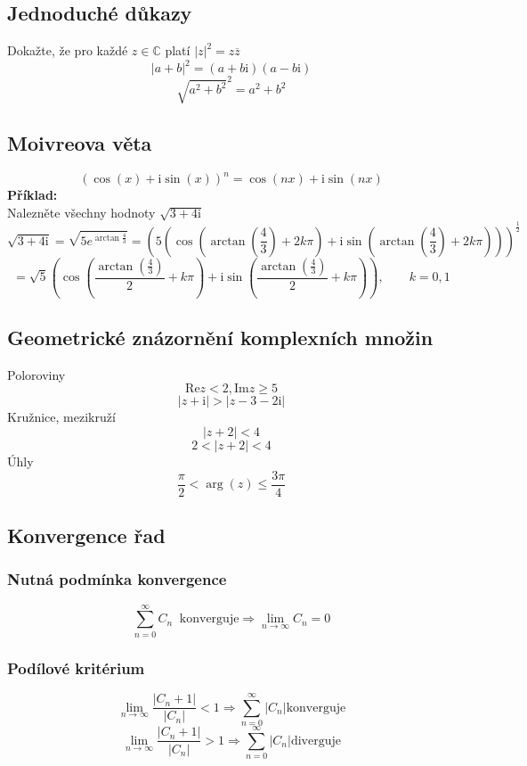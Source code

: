 \documentclass{article}
\newcommand{\mi}{\mathrm{i}}
\newcommand{\re}{\mathrm{Re}}
\newcommand{\im}{\mathrm{Im}}
\begin{document}
        \subsection{Jednoduché důkazy}
            Dokažte, že pro každé $z\in\mathbb{C}$ platí $|z|^2=z\overline{z}$
                \[|a+b|^2=(a+b\mi)(a-b\mi)\]
                \[\sqrt{a^2+b^2}^2=a^2+b^2\]
        \subsection{Moivreova věta}
                \[(\cos(x)+\mi\sin(x))^n=\cos(nx)+\mi\sin(nx)\]
                {\bf Příklad:}\\
                Nalezněte všechny hodnoty $\sqrt{3+4\mi}$
                \[\sqrt{3+4\mi}=\sqrt{5e^{\arctan\frac{4}{3}}}=(5(\cos(\arctan\left(\frac{4}{3}\right)+2k\pi)+
                \mi\sin(\arctan\left(\frac{4}{3}\right)+2k\pi)))^{\frac{1}{2}}\]
                \[=\sqrt{5}(\cos\left(\frac{\arctan\left(\frac{4}{3}\right)}{2}+k\pi\right)+
                \mi\sin\left(\frac{\arctan\left(\frac{4}{3}\right)}{2}+k\pi\right)),
                \qquad k = 0,1\]
        \subsection{Geometrické znázornění komplexních množin}
            Poloroviny
                \[\re z<2, \im z\geq 5\]
                \[|z+\mi|>|z-3-2\mi|\]
            Kružnice, mezikruží
                \[|z+2|<4\]
                \[2<|z+2|<4\]
            Úhly
            \[\frac{\pi}{2}<\arg(z)\leq\frac{3\pi}{4}\]
        \subsection{Konvergence řad}
            \subsubsection*{Nutná podmínka konvergence}
                \[\sum_{n=0}^\infty C_n \:\mbox{ konverguje} \Rightarrow \lim_{n\to\infty}C_n=0\]
            \subsubsection*{Podílové kritérium}
                \[\lim_{n\to\infty}\frac{|C_n+1|}{|C_n|}<1 
                \Rightarrow \sum_{n=0}^\infty |C_n| \mbox{konverguje}\]
                \[\lim_{n\to\infty}\frac{|C_n+1|}{|C_n|}>1 
                \Rightarrow \sum_{n=0}^\infty |C_n| \mbox{diverguje}\]
\end{document}
